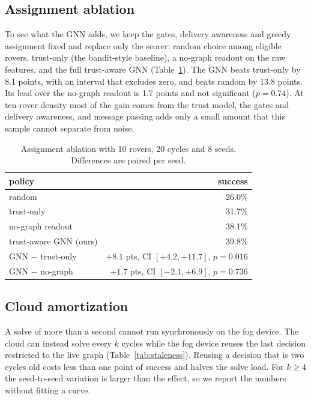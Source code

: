 \documentclass[11pt]{article}
\begin{document}
\subsection{Assignment ablation}
\label{sec:ablation}

To see what the GNN adds, we keep the gates, delivery awareness and greedy
assignment fixed and replace only the scorer: random choice among eligible
rovers, trust-only (the bandit-style baseline), a no-graph readout on the raw
features, and the full trust-aware GNN (Table~\ref{tab:ablation}). The GNN
beats trust-only by 8.1 points, with an interval that excludes zero, and
beats random by 13.8 points. Its lead over the no-graph readout is 1.7 points
and not significant ($p=0.74$). At ten-rover density most of the gain comes
from the trust model, the gates and delivery awareness, and message passing
adds only a small amount that this sample cannot separate from noise.

\begin{table}[t]
\centering
\caption{Assignment ablation with 10 rovers, 20 cycles and 8 seeds.
Differences are paired per seed.}
\label{tab:ablation}
\small
\begin{tabular}{@{}lr@{}}
\toprule
policy & success \\
\midrule
random & 26.0\% \\
trust-only & 31.7\% \\
no-graph readout & 38.1\% \\
trust-aware GNN (ours) & 39.8\% \\
\midrule
GNN $-$ trust-only & $+8.1$ pts, CI $[+4.2,+11.7]$, $p=0.016$ \\
GNN $-$ no-graph & $+1.7$ pts, CI $[-2.1,+6.9]$, $p=0.736$ \\
\bottomrule
\end{tabular}
\end{table}

\subsection{Cloud amortization}

A solve of more than a second cannot run synchronously on the fog device. The
cloud can instead solve every $k$ cycles while the fog device reuses the last
decision restricted to the live graph (Table~\ref{tab:staleness}). Reusing a
decision that is two cycles old costs less than one point of success and
halves the solve load. For $k\ge4$ the seed-to-seed variation is larger than
the effect, so we report the numbers without fitting a curve.
\end{document}
